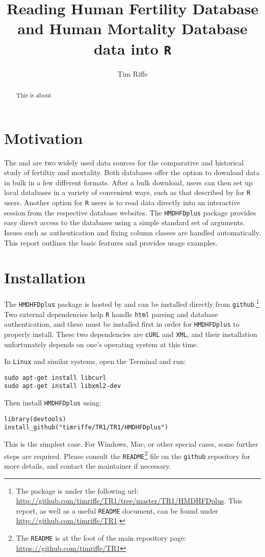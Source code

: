 \documentclass{article}
\begin{document}
\title{Reading Human Fertility Database and Human Mortality Database data into \texttt{R}}
\author{Tim Riffe}
\maketitle
\begin{abstract}
This is about
\end{abstract}

\section{Motivation}
The \citet{HFD} and \citet{HMD} are two widely used data sources
for the comparative and historical study of fertiltiy and mortality. Both
databases offer the option to download data in bulk in a few different formats. After a bulk
download, users can then set up local databases in a variety of
convenient ways, such as that described by \citet{minton2015} for \texttt{R}
\citep{Rcitation} users. Another option for \texttt{R} users is to read data
directly into an interactive session from the respective database websites. The \texttt{HMDHFDplus} package
provides easy direct access to the databases using a simple standard set of
arguments. Issues such as authentication and fixing column classes are handled
automatically. This report outlines the basic features and provides usage
examples.

\section{Installation}
The \texttt{HMDHFDplus} package is hosted by and can be installed
directly from \texttt{github}.\footnote{The package is under the following url:
\url{http://github.com/timriffe/TR1/tree/master/TR1/HMDHFDplus}. This report,
as well as a useful \texttt{README} document, can be found under
\url{http://github.com/timriffe/TR1}.} Two external dependencies help \texttt{R}
handle \texttt{html} parsing and database authentication, and these must be installed first in order for \texttt{HMDHFDplus} to properly install.
These two dependencies are \texttt{cURL} and \texttt{XML}, and their
installation unfortunately depends on one's operating system at this time.

In \texttt{Linux} and similar systems, open the Terminal and run:
\begin{verbatim}
sudo apt-get install libcurl
sudo apt-get install libxml2-dev
\end{verbatim}
Then install \texttt{HMDHFDplus} using:
\begin{verbatim}
library(devtools)
install_github("timriffe/TR1/TR1/HMDHFDplus")
\end{verbatim}
This is the simplest case. For Windows, Mac, or other special cases, some
further steps are required. Please consult the
\texttt{README}\footnote{The
\texttt{README} is at the
foot of the main repository
page: \url{https://github.com/timriffe/TR1}} file on the
\texttt{github} repository for more details, and contact the maintainer if
necessary.
\end{document}
